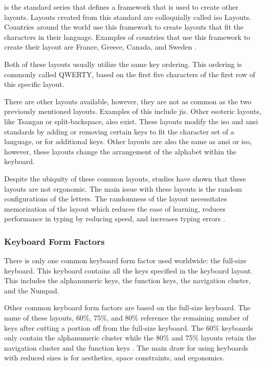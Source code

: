 \documentclass{report}
\begin{document}
\citeauthor{iso} is the standard series that defines a framework that is used to
create other layouts. Layouts created from this standard are colloquially called
\ac{iso} Layouts. Countries around the world use this framework to create
layouts that fit the characters in their language. Examples of countries that
use this framework to create their layout are France, Greece, Canada, and Sweden
\parencite{apple-layout}.

Both of these layouts usually utilize the same key ordering. This ordering is
commonly called QWERTY, based on the first five characters of the first row
of this specific layout.

There are other layouts available, however, they are not as common as the two
previously mentioned layouts. Examples of this include \ac{jis}. Other esoteric
layouts, like Tsangan or split-backspace, also exist. These layouts modify the
\ac{iso} and \ac{ansi} standards by adding or removing certain keys to fit the
character set of a language, or for additional keys. Other layouts are also the
same as \ac{ansi} or \ac{iso}, however, these layouts change the arrangement of
the alphabet within the keyboard.

Despite the ubiquity of these common layouts, studies have shown that these
layouts are not ergonomic. The main issue with these layouts is the random
configurations of the letters. The randomness of the layout necessitates
memorization of the layout which reduces the ease of learning, reduces performance
in typing by reducing speed, and increases typing errors
\parencite{ciobanu2015}.

\subsubsection{Keyboard Form Factors}

There is only one common keyboard form factor used worldwide: the full-size
keyboard. This keyboard contains all the keys specified in the keyboard
layout. This includes the alphanumeric keys, the function keys, the navigation
cluster, and the Numpad.

Other common keyboard form factors are based on the full-size keyboard. The name
of these layouts, 60\%, 75\%, and 80\% reference the remaining number of keys
after cutting a portion off from the full-size keyboard. The 60\% keyboards only
contain the alphanumeric cluster while the 80\% and 75\% layouts retain the
navigation cluster and the function keys \parencite{parkkinen2018}. The main
draw for using keyboards with reduced sizes is for aesthetics, space
constraints, and ergonomics.
\end{document}

